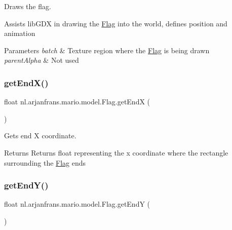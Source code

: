 Draws the flag. 

Assists lib\+G\+DX in drawing the \hyperlink{classnl_1_1arjanfrans_1_1mario_1_1model_1_1Flag}{Flag} into the world, defines position and animation 
\begin{DoxyParams}{Parameters}
{\em batch} & Texture region where the \hyperlink{classnl_1_1arjanfrans_1_1mario_1_1model_1_1Flag}{Flag} is being drawn \\
\hline
{\em parent\+Alpha} & Not used \\
\hline
\end{DoxyParams}
\mbox{\label{classnl_1_1arjanfrans_1_1mario_1_1model_1_1Flag_ae6e50aebb2bedd7b306ee99685212b2c}} 
\subsubsection{\texorpdfstring{get\+End\+X()}{getEndX()}}
{\footnotesize\ttfamily float nl.\+arjanfrans.\+mario.\+model.\+Flag.\+get\+EndX (\begin{DoxyParamCaption}{ }\end{DoxyParamCaption})}



Gets end X coordinate. 

\begin{DoxyReturn}{Returns}
Returns float representing the x coordinate where the rectangle surrounding the \hyperlink{classnl_1_1arjanfrans_1_1mario_1_1model_1_1Flag}{Flag} ends 
\end{DoxyReturn}
\mbox{\label{classnl_1_1arjanfrans_1_1mario_1_1model_1_1Flag_a0dee35b76827d958f8054e2fb5854a7b}} 
\subsubsection{\texorpdfstring{get\+End\+Y()}{getEndY()}}
{\footnotesize\ttfamily float nl.\+arjanfrans.\+mario.\+model.\+Flag.\+get\+EndY (\begin{DoxyParamCaption}{ }\end{DoxyParamCaption})}



